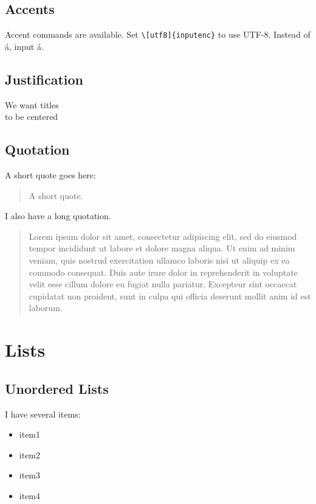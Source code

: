 \documentclass[a4paper,12pt]{article}
\newcommand{\code}[1]{\texttt{#1}}
\begin{document}
\subsection{Accents}

Accent commands are available. Set \code{\textbackslash [utf8]\{inputenc\}} to use UTF-8. Instead of
\'{a}, input  á.

\subsection{Justification}

\begin{center}
  We want titles \\
  to be centered \\
\end{center}

\subsection{Quotation}

A short quote goes here:

\begin{quote}
A short quote.
\end{quote}

I also have a long quotation.

\begin{quotation}
  Lorem ipsum dolor sit amet, consectetur adipiscing elit, sed do eiusmod tempor incididunt ut labore et dolore magna aliqua. Ut enim ad minim veniam, quis nostrud exercitation ullamco laboris nisi ut aliquip ex ea commodo consequat. Duis aute irure dolor in reprehenderit in voluptate velit esse cillum dolore eu fugiat nulla pariatur. Excepteur sint occaecat cupidatat non proident, sunt in culpa qui officia deserunt mollit anim id est laborum.
\end{quotation}

\section{Lists}

\subsection{Unordered Lists}

I have several items:

\begin{itemize}
  \item item1
  \item item2
  \item item3
\item item4
\end{itemize}
\end{document}
